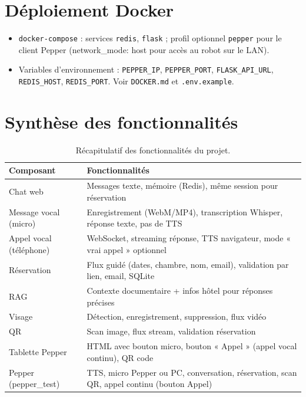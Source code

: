 \documentclass[12pt,a4paper]{article}
\begin{document}
\section{Déploiement Docker}

\begin{itemize}[noitemsep]
  \item \texttt{docker-compose} : services \texttt{redis}, \texttt{flask} ; profil optionnel \texttt{pepper} pour le client Pepper (network\_mode: host pour accès au robot sur le LAN).
  \item Variables d'environnement : \texttt{PEPPER\_IP}, \texttt{PEPPER\_PORT}, \texttt{FLASK\_API\_URL}, \texttt{REDIS\_HOST}, \texttt{REDIS\_PORT}. Voir \texttt{DOCKER.md} et \texttt{.env.example}.
\end{itemize}

\section{Synthèse des fonctionnalités}

\begin{table}[h]
\centering
\begin{tabular}{@{}ll@{}}
\toprule
\textbf{Composant} & \textbf{Fonctionnalités} \\
\midrule
Chat web & Messages texte, mémoire (Redis), même session pour réservation \\
Message vocal (micro) & Enregistrement (WebM/MP4), transcription Whisper, réponse texte, pas de TTS \\
Appel vocal (téléphone) & WebSocket, streaming réponse, TTS navigateur, mode « vrai appel » optionnel \\
Réservation & Flux guidé (dates, chambre, nom, email), validation par lien, email, SQLite \\
RAG & Contexte documentaire + infos hôtel pour réponses précises \\
Visage & Détection, enregistrement, suppression, flux vidéo \\
QR & Scan image, flux stream, validation réservation \\
Tablette Pepper & HTML avec bouton micro, bouton « Appel » (appel vocal continu), QR code \\
Pepper (pepper\_test) & TTS, micro Pepper ou PC, conversation, réservation, scan QR, appel continu (bouton Appel) \\
\bottomrule
\end{tabular}
\caption{Récapitulatif des fonctionnalités du projet.}
\end{table}
\end{document}
